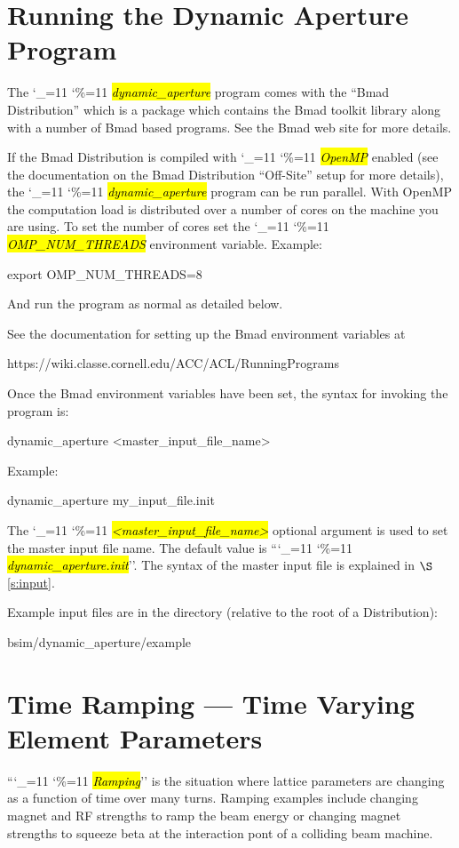 \documentclass{hitec}
\newcommand\dottcmd[1]{\hl{\em#1}\endgroup}
\newcommand{\vn}{\begingroup\catcode`\_=11 \catcode`\%=11 \dottcmd}
\newcommand{\da}{\vn{dynamic_aperture}\xspace}
\newcommand{\sref}[1]{$\S$\ref{#1}}
\newcommand{\Section}[1]{\section{#1}\vspace*{-1ex}}
\begin{document}
\Section{Running the Dynamic Aperture Program} 
\label{s:run}

The \da program comes with the ``Bmad Distribution'' which is a package which contains the Bmad toolkit
library along with a number of Bmad based programs. See the Bmad web site for more details.

If the Bmad Distribution is compiled with \vn{OpenMP} enabled (see the documentation on the Bmad
Distribution ``Off-Site'' setup for more details), the \da program can be run parallel. With OpenMP
the computation load is distributed over a number of cores on the machine you are using. To set the
number of cores set the \vn{OMP_NUM_THREADS} environment variable. Example:
\begin{code}
export OMP_NUM_THREADS=8
\end{code}
And run the program as normal as detailed below.

See the documentation for setting up the Bmad environment variables at
\begin{code}
  https://wiki.classe.cornell.edu/ACC/ACL/RunningPrograms
\end{code}

Once the Bmad environment variables have been set, the syntax for invoking the program is:
\begin{code}
  dynamic_aperture {<master_input_file_name>}
\end{code}
Example:
\begin{code}
  dynamic_aperture my_input_file.init
\end{code}
The \vn{<master_input_file_name>} optional argument is used to set the master input file name. The
default value is ``\vn{dynamic_aperture.init}''. The syntax of the master input file is explained
in \sref{s:input}.

Example input files are in the directory (relative to the root of a Distribution):
\begin{code}
  bsim/dynamic_aperture/example
\end{code}

\Section{Time Ramping --- Time Varying Element Parameters}
\label{s:ramp}

``\vn{Ramping}'' is the situation where lattice parameters are changing as a function of time over
many turns. Ramping examples include changing magnet and RF strengths to ramp the beam energy or
changing magnet strengths to squeeze beta at the interaction pont of a colliding beam machine.
\end{document}
